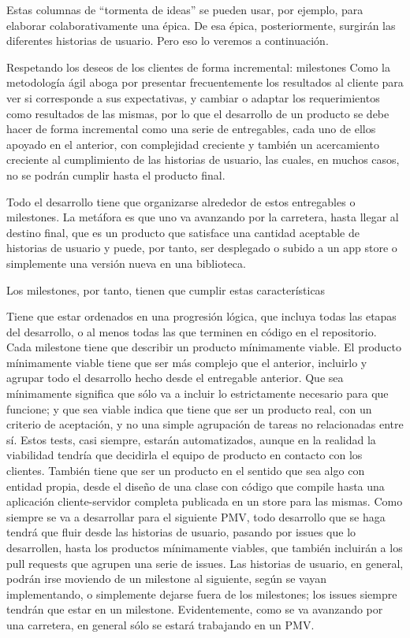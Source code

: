 Estas columnas de “tormenta de ideas” se pueden usar, por ejemplo, 
para elaborar colaborativamente una épica. De esa épica, 
posteriormente, surgirán las diferentes historias de usuario. 
Pero eso lo veremos a continuación.

Respetando los deseos de los clientes de forma incremental: milestones
Como la metodología ágil aboga por presentar frecuentemente 
los resultados al cliente para ver si corresponde a sus 
expectativas, y cambiar o adaptar los requerimientos como 
resultados de las mismas, por lo que el desarrollo de un 
producto se debe hacer de forma incremental como una serie 
de entregables, cada uno de ellos apoyado en el anterior, 
con complejidad creciente y también un acercamiento creciente 
al cumplimiento de las historias de usuario, las cuales, en muchos 
casos, no se podrán cumplir hasta el producto final.

Todo el desarrollo tiene que organizarse alrededor de estos 
entregables o milestones. La metáfora es que uno va avanzando 
por la carretera, hasta llegar al destino final, que es un 
producto que satisface una cantidad aceptable de historias 
de usuario y puede, por tanto, ser desplegado o subido a un 
app store o simplemente una versión nueva en una biblioteca.

Los milestones, por tanto, tienen que cumplir estas características

Tiene que estar ordenados en una progresión lógica, que incluya 
todas las etapas del desarrollo, o al menos todas las que terminen 
en código en el repositorio.
Cada milestone tiene que describir un producto mínimamente viable. 
El producto mínimamente viable tiene que ser más complejo que 
el anterior, incluirlo y agrupar todo el desarrollo hecho desde 
el entregable anterior.
Que sea mínimamente significa que sólo va a incluir lo 
estrictamente necesario para que funcione; y que sea viable 
indica que tiene que ser un producto real, con un criterio 
de aceptación, y no una simple agrupación de tareas no 
relacionadas entre sí. Estos tests, casi siempre, estarán 
automatizados, aunque en la realidad la viabilidad tendría 
que decidirla el equipo de producto en contacto con los clientes.
También tiene que ser un producto en el sentido que sea algo 
con entidad propia, desde el diseño de una clase con código 
que compile hasta una aplicación cliente-servidor completa 
publicada en un store para las mismas.
Como siempre se va a desarrollar para el siguiente PMV, 
todo desarrollo que se haga tendrá que fluir desde las 
historias de usuario, pasando por issues que lo desarrollen, 
hasta los productos mínimamente viables, que también incluirán 
a los pull requests que agrupen una serie de issues. Las 
historias de usuario, en general, podrán irse moviendo de 
un milestone al siguiente, según se vayan implementando, 
o simplemente dejarse fuera de los milestones; los issues 
siempre tendrán que estar en un milestone. Evidentemente, 
como se va avanzando por una carretera, en general sólo 
se estará trabajando en un PMV.

